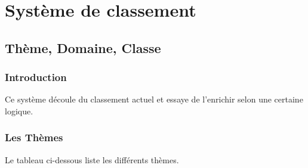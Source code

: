\documentclass[12pt,titlepage]{book}
\begin{document}
\mainmatter

\part{Système de classement}

\chapter{Thème, Domaine, Classe}

\section{Introduction}
Ce système découle du classement actuel et essaye de l'enrichir selon une certaine logique.

\section{Les Thèmes}
Le tableau ci-dessous liste les différents thèmes.
\vspace{\baselineskip}
\end{document}
